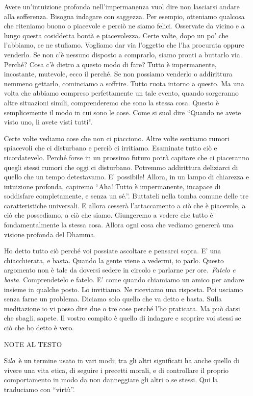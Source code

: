 Avere un'intuizione profonda nell'impermanenza vuol dire non lasciarsi
andare alla sofferenza. Bisogna indagare con saggezza. Per esempio,
otteniamo qualcosa che riteniamo buono o piacevole e perciò ne siamo
felici. Osservate da vicino e a lungo questa cosiddetta bontà e
piacevolezza. Certe volte, dopo un po' che l'abbiamo, ce ne stufiamo.
Vogliamo dar via l'oggetto che l'ha procurata oppure venderlo. Se non
c'è nessuno disposto a comprarlo, siamo pronti a buttarlo via. Perché?
Cosa c'è dietro a questo modo di fare? Tutto è impermanente, incostante,
mutevole, ecco il perché. Se non possiamo venderlo o addirittura nemmeno
gettarlo, cominciamo a soffrire. Tutto ruota intorno a questo. Ma una
volta che abbiamo compreso perfettamente un tale evento, quando
sorgeranno altre situazioni simili, comprenderemo che sono la stessa
cosa. Questo è semplicemente il modo in cui sono le cose. Come si suol
dire ``Quando ne avete visto uno, li avete visti tutti''.

Certe volte vediamo cose che non ci piacciono. Altre volte sentiamo
rumori spiacevoli che ci disturbano e perciò ci irritiamo. Esaminate
tutto ciò e ricordatevelo. Perché forse in un prossimo futuro potrà
capitare che ci piaceranno quegli stessi rumori che oggi ci disturbano.
Potremmo addirittura deliziarci di quello che un tempo detestavamo. E'
possibile! Allora, in un lampo di chiarezza e intuizione profonda,
capiremo ``Aha! Tutto è impermanente, incapace di soddisfare
completamente, e senza un sé.''. Buttateli nella tomba comune delle tre
caratteristiche universali. E allora cesserà l'attaccamento a ciò che è
piacevole, a ciò che possediamo, a ciò che siamo. Giungeremo a vedere
che tutto è fondamentalmente la stessa cosa. Allora ogni cosa che
vediamo genererà una visione profonda del Dhamma.

Ho detto tutto ciò perché voi possiate ascoltare e pensarci sopra. E'
una chiacchierata, e basta. Quando la gente viene a vedermi, io parlo.
Questo argomento non è tale da doversi sedere in circolo e parlarne per
ore.~\emph{Fatelo e basta}. Comprendetelo e fatelo. E' come quando
chiamiamo un amico per andare insieme in qualche posto. Lo invitiamo. Ne
riceviamo una risposta. Poi usciamo senza farne un problema. Diciamo
solo quello che va detto e basta. Sulla meditazione io vi posso dire due
o tre cose perché l'ho praticata. Ma può darsi che sbagli, sapete. Il
vostro compito è quello di indagare e scoprire voi stessi se ciò che ho
detto è vero.

NOTE AL TESTO

S\emph{ila~}è un termine usato in vari modi; tra gli altri significati
ha anche quello di vivere una vita etica, di seguire i precetti morali,
e di controllare il proprio comportamento in modo da non danneggiare gli
altri o se stessi. Qui la traduciamo con ``virtù''.


